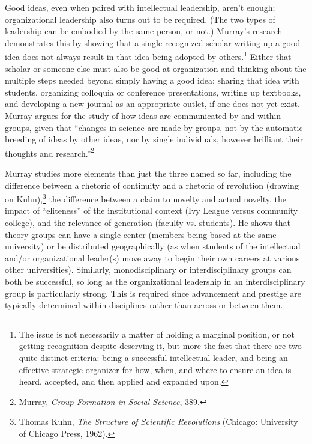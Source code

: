\documentclass{tufte-handout}
\begin{document}
Good ideas, even when paired with intellectual leadership, aren't
enough; organizational leadership also turns out to be required. (The
two types of leadership can be embodied by the same person, or not.)
Murray's research demonstrates this by showing that a single recognized
scholar writing up a good idea does not always result in that idea being
adopted by others.\footnote{The issue is not necessarily a matter of holding a marginal position,
  or not getting recognition despite deserving it, but more the fact
  that there are two quite distinct criteria: being a successful
  intellectual leader, and being an effective strategic organizer for
  how, when, and where to ensure an idea is heard, accepted, and then
  applied and expanded upon.
} Either that
scholar or someone else must also be good at organization and thinking
about the multiple steps needed beyond simply having a good idea:
sharing that idea with students, organizing colloquia or conference
presentations, writing up textbooks, and developing a new journal as an
appropriate outlet, if one does not yet exist. Murray argues for the
study of how ideas are communicated by and within groups, given that
``changes in science are made by groups, not by the automatic breeding
of ideas by other ideas, nor by single individuals, however brilliant
their thoughts and research.''\footnote{Murray, \emph{Group Formation in Social Science}, 389.
}

Murray studies more elements than just the three named so far, including
the difference between a rhetoric of continuity and a rhetoric of
revolution (drawing on Kuhn),\footnote{Thomas Kuhn, \emph{The Structure of Scientific Revolutions} (Chicago:
  University of Chicago Press, 1962).
} the
difference between a claim to novelty and actual novelty, the impact of
``eliteness'' of the institutional context (Ivy League versus community
college), and the relevance of generation (faculty vs. students). He
shows that theory groups can have a single center (members being based
at the same university) or be distributed geographically (as when
students of the intellectual and/or organizational leader(s) move away
to begin their own careers at various other universities). Similarly,
monodisciplinary or interdisciplinary groups can both be successful, so
long as the organizational leadership in an interdisciplinary group is
particularly strong. This is required since advancement and prestige are
typically determined within disciplines rather than across or between
them.
\end{document}
